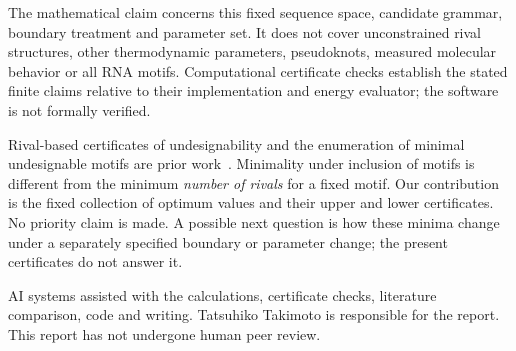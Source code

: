 \documentclass[10pt,a4paper]{article}
\begin{document}
The mathematical claim concerns this fixed sequence space, candidate grammar, boundary treatment and parameter set. It does not cover unconstrained rival structures, other thermodynamic parameters, pseudoknots, measured molecular behavior or all RNA motifs. Computational certificate checks establish the stated finite claims relative to their implementation and energy evaluator; the software is not formally verified.

Rival-based certificates of undesignability and the enumeration of minimal undesignable motifs are prior work~\cite{rigende,fastmotif,journal}. Minimality under inclusion of motifs is different from the minimum \emph{number of rivals} for a fixed motif. Our contribution is the fixed collection of optimum values and their upper and lower certificates. No priority claim is made. A possible next question is how these minima change under a separately specified boundary or parameter change; the present certificates do not answer it.

AI systems assisted with the calculations, certificate checks, literature comparison, code and writing. Tatsuhiko Takimoto is responsible for the report. This report has not undergone human peer review.
\end{document}
